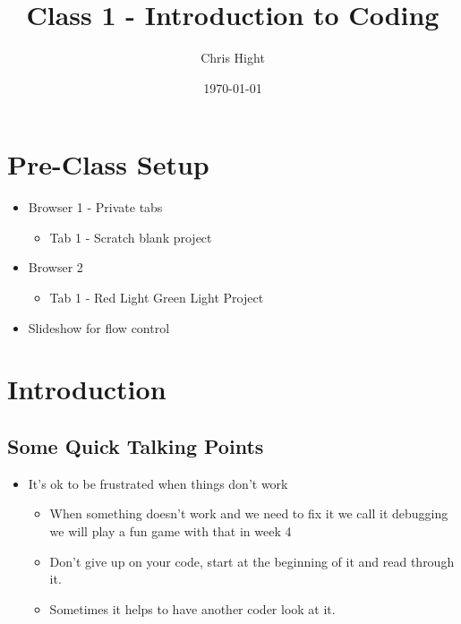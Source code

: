 \documentclass[12pt]{article}
\title{Class 1 - Introduction to Coding}
\author{Chris Hight}
\date{\today}
\begin{document}
\maketitle

\section*{Pre-Class Setup}
	\begin{itemize}
		
		\item Browser 1 - Private tabs
		\begin{itemize}
			\item Tab 1 - Scratch blank project
		\end{itemize}
		
		\item Browser 2
		\begin{itemize}
			\item Tab 1 - Red Light Green Light Project
		\end{itemize} 
		
		\item Slideshow for flow control

	\end{itemize}


\section*{Introduction}

\subsection*{Some Quick Talking Points}
	\begin{itemize}
		\item It’s ok to be frustrated when things don't work
		\begin{itemize}
			\item When something doesn't work and we need to fix it we call it debugging we will play a fun game with that in week 4
			\item Don’t give up on your code, start at the beginning of it and read through it.
			\item Sometimes it helps to have another coder look at it.
		\end{itemize}
	\end{itemize}
\end{document}

